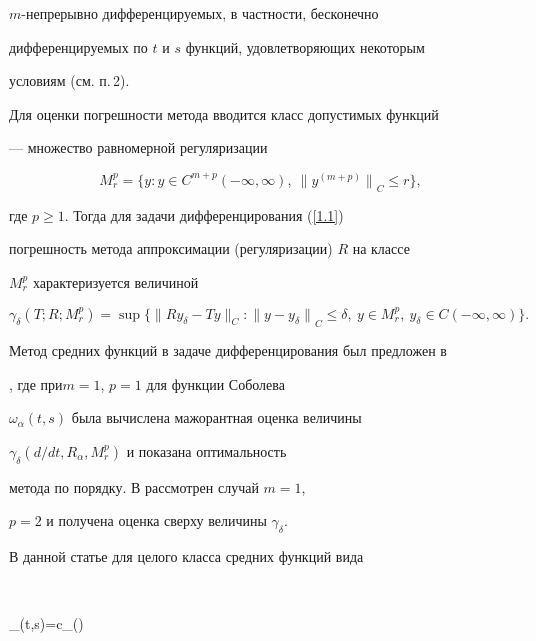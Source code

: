 $m$-непрерывно дифференцируемых, в частности, бесконечно


дифференцируемых по $t$ и $s$ функций, удовлетворяющих некоторым


условиям (см. п.\,2).





Для оценки погрешности метода вводится класс допустимых функций


--- множество равномерной регуляризации


$$




M_r^p=\{ y: y\in C^{m+p}(-\infty,\infty),\ {\|y^{(m+p)}\|}_C \leq r \},




$$


где $p\geq 1$. Тогда для задачи дифференцирования (\ref{1.1})


погрешность метода аппроксимации (регуляризации) $R$ на классе


$M_r^p$ характеризуется величиной


$$


\gamma_\delta(T;R;M_r^p)=\sup\{\|R y_\delta - T


y\|_C: {\|y-y_\delta\|}_C \leq \delta,\ 


y \in M_r^p,\ y_\delta \in C(-\infty,\infty)\}.\label{1.4}


$$





Метод средних функций в задаче дифференцирования был предложен в


\cite{first}, где при\linebreak $m=1$, $p=1$ для функции Соболева


$\omega_\alpha(t,s)$ была вычислена мажорантная оценка величины


$\gamma_\delta(d/d t,R_\alpha,M_r^p)$ и показана оптимальность


метода по порядку. В \cite{Grch} рассмотрен случай $m=1$,


$p=2$ и получена оценка сверху величины $\gamma_\delta$.





В данной статье для целого класса средних функций вида


$$


\omega_\alpha(t,s)=c_\alpha \omega\bigg(\bigg)


